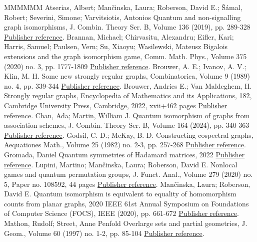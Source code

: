 \begin{thebibliography}{MMMMMM}
 Atserias, Albert; Mančinska, Laura; Roberson, David E.; Šámal, Robert; Severini, Simone; Varvitsiotis, Antonios Quantum and non-signalling graph isomorphisms, J. Combin. Theory Ser. B, Volume 136 (2019), pp. 289-328 \href{https://alco.centre-mersenne.org/articles/10.5802/alco.335/#AMRSSV}{Publisher reference}.
 Brannan, Michael; Chirvasitu, Alexandru; Eifler, Kari; Harris, Samuel; Paulsen, Vern; Su, Xiaoyu; Wasilewski, Mateusz Bigalois extensions and the graph isomorphism game, Comm. Math. Phys., Volume 375 (2020) no. 3, pp. 1777-1809 \href{https://alco.centre-mersenne.org/articles/10.5802/alco.335/#BCEHPSW}{Publisher reference}.
 Brouwer, A. E.; Ivanov, A. V.; Klin, M. H. Some new strongly regular graphs, Combinatorica, Volume 9 (1989) no. 4, pp. 339-344 \href{https://alco.centre-mersenne.org/articles/10.5802/alco.335/#BIK}{Publisher reference}.
 Brouwer, Andries E.; Van Maldeghem, H. Strongly regular graphs, Encyclopedia of Mathematics and its Applications, 182, Cambridge University Press, Cambridge, 2022, xvii+462 pages \href{https://alco.centre-mersenne.org/articles/10.5802/alco.335/#BVM}{Publisher reference}.
 Chan, Ada; Martin, William J. Quantum isomorphism of graphs from association schemes, J. Combin. Theory Ser. B, Volume 164 (2024), pp. 340-363 \href{https://alco.centre-mersenne.org/articles/10.5802/alco.335/#CM}{Publisher reference}.
 Godsil, C. D.; McKay, B. D. Constructing cospectral graphs, Aequationes Math., Volume 25 (1982) no. 2-3, pp. 257-268 \href{https://alco.centre-mersenne.org/articles/10.5802/alco.335/#GM}{Publisher reference}.
 Gromada, Daniel Quantum symmetries of Hadamard matrices, 2022 \href{https://alco.centre-mersenne.org/articles/10.5802/alco.335/#G}{Publisher reference}.
 Lupini, Martino; Mančinska, Laura; Roberson, David E. Nonlocal games and quantum permutation groups, J. Funct. Anal., Volume 279 (2020) no. 5, Paper no. 108592, 44 pages \href{https://alco.centre-mersenne.org/articles/10.5802/alco.335/#LMR}{Publisher reference}.
 Mančinska, Laura; Roberson, David E. Quantum isomorphism is equivalent to equality of homomorphism counts from planar graphs, 2020 IEEE 61st Annual Symposium on Foundations of Computer Science (FOCS), IEEE (2020), pp. 661-672 \href{https://alco.centre-mersenne.org/articles/10.5802/alco.335/#MRplanar}{Publisher reference}.
 Mathon, Rudolf; Street, Anne Penfold Overlarge sets and partial geometries, J. Geom., Volume 60 (1997) no. 1-2, pp. 85-104 \href{https://alco.centre-mersenne.org/articles/10.5802/alco.335/#MS}{Publisher reference}.

\end{thebibliography}

